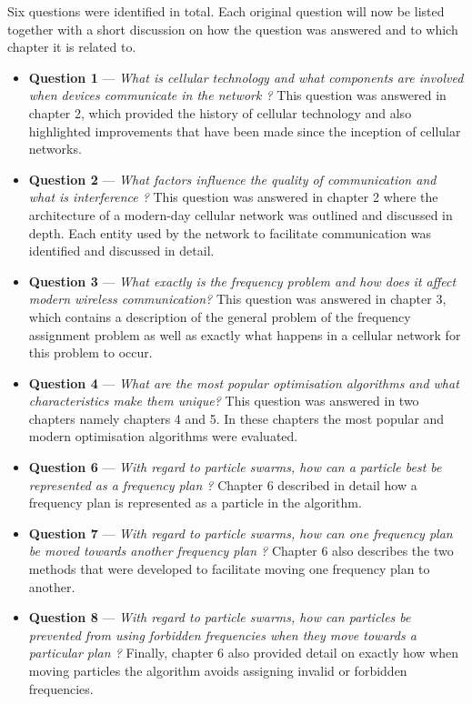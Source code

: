 Six questions were identified in total. Each original question will now be listed together with a short discussion on how the question was answered and to which chapter it is related to.
\begin{itemize}
\item \textbf{Question 1} --- \emph{What is cellular technology and what components are involved when devices communicate in the network ?} This question was answered in chapter 2, which provided the history of cellular technology and also highlighted improvements that have been made since the inception of cellular networks.
\item \textbf{Question 2} --- \emph{What factors influence the quality of communication and what is interference ?} This question was answered in chapter 2 where the architecture of a modern-day cellular network was outlined and discussed in depth. Each entity used by the network to facilitate communication was identified and discussed in detail.
\item \textbf{Question 3} --- \emph{What exactly is the frequency problem and how does it affect modern wireless communication? } This question was answered in chapter 3, which contains a description of the general problem of the frequency assignment problem as well as exactly what happens in a cellular network for this problem to occur.
\item \textbf{Question 4} --- \emph{What are the most popular optimisation algorithms and what characteristics make them unique?} This question was answered in two chapters namely chapters 4 and 5. In these chapters the most popular and modern optimisation algorithms were evaluated.
\item \textbf{Question 6} --- \emph{With regard to particle swarms, how can a particle best be represented as a frequency plan ?} Chapter 6 described in detail how a frequency plan is represented as a particle in the algorithm.
\item \textbf{Question 7} --- \emph{With regard to particle swarms, how can one frequency plan be moved towards another frequency plan ?} Chapter 6 also describes the two methods that were developed to facilitate moving one frequency plan to another.
\item \textbf{Question 8} --- \emph{With regard to particle swarms, how can particles be prevented from using forbidden frequencies when they move towards a particular plan ?} Finally, chapter 6 also provided detail on exactly how when moving particles the algorithm avoids assigning invalid or forbidden frequencies.
\end{itemize}

